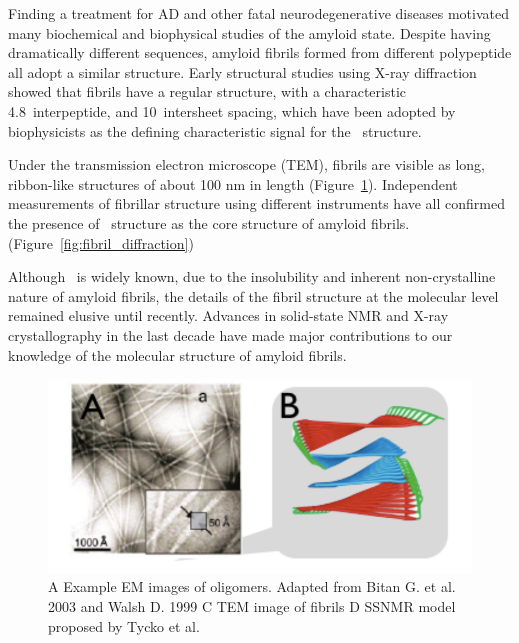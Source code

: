 Finding a treatment for AD and other fatal neurodegenerative diseases motivated many biochemical and biophysical studies of the amyloid state. Despite having dramatically different sequences, amyloid fibrils formed from different polypeptide all adopt a similar structure. Early structural studies using X-ray diffraction showed that fibrils have a regular structure, with a characteristic 4.8\angstrom\ interpeptide, and 10\angstrom\ intersheet spacing, which have been adopted by biophysicists as the defining characteristic signal for the \crossb\ structure.

Under the transmission electron microscope (TEM), fibrils are visible as long, ribbon-like structures of about 100 nm in length (Figure~\ref{fig:fibril_TEM_SSNMR}). Independent measurements of fibrillar structure using different instruments have all confirmed the presence of \crossb\ structure as the core structure of amyloid fibrils. (Figure~\ref{fig:fibril_diffraction})


Although \crossb\ is widely known, due to the insolubility and inherent non-crystalline nature of amyloid fibrils, the details of the fibril structure at the molecular level remained elusive until recently. Advances in solid-state NMR and X-ray crystallography in the last decade have made major contributions to our knowledge of the molecular structure of amyloid fibrils.

\begin{figure}
  \centering
  \includegraphics[width=6in]{figures/introduction/fibril_TEM_SSNMR.pdf}
  \caption[Characteristic cross-$\beta$ spacings from X-ray fibre diffraction studies of amyloid fibrils]{A Example EM images of oligomers.  Adapted from Bitan G. et al. 2003 and Walsh D. 1999 C TEM image of fibrils D SSNMR model proposed by Tycko et al.}
  \label{fig:fibril_TEM_SSNMR}
\end{figure}


